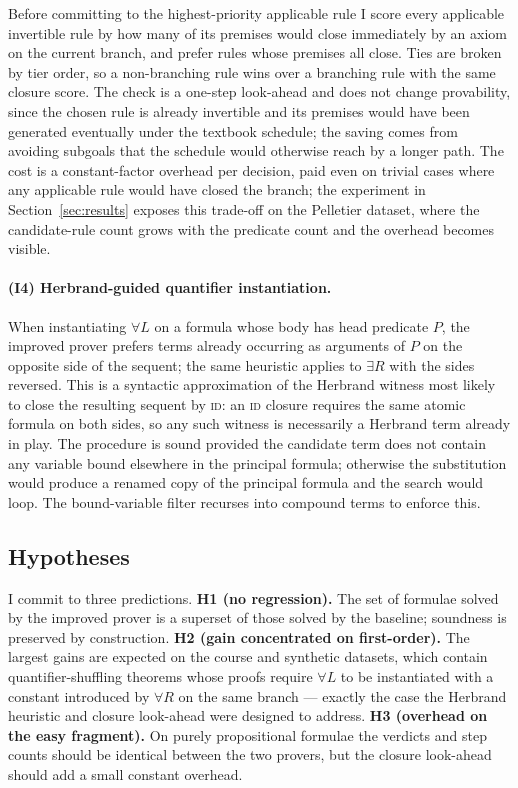 \documentclass[runningheads]{llncs}
\begin{document}
Before committing to the highest-priority applicable rule I score every
applicable invertible rule by how many of its premises would close
immediately by an axiom on the current branch, and prefer rules whose
premises all close. Ties are broken by tier order, so a non-branching
rule wins over a branching rule with the same closure score. The check
is a one-step look-ahead and does not change provability, since the
chosen rule is already invertible and its premises would have been
generated eventually under the textbook schedule; the saving comes from
avoiding subgoals that the schedule would otherwise reach by a longer
path. The cost is a constant-factor overhead per decision, paid even on
trivial cases where any applicable rule would have closed the branch;
the experiment in Section~\ref{sec:results} exposes this trade-off on
the Pelletier dataset, where the candidate-rule count grows with the
predicate count and the overhead becomes visible.

\paragraph{(I4) Herbrand-guided quantifier instantiation.}

When instantiating $\forall L$ on a formula whose body has head
predicate $P$, the improved prover prefers terms already occurring as
arguments of $P$ on the opposite side of the sequent; the same
heuristic applies to $\exists R$ with the sides reversed. This is a
syntactic approximation of the Herbrand witness most likely to close
the resulting sequent by \textsc{id}: an \textsc{id} closure requires
the same atomic formula on both sides, so any such witness is
necessarily a Herbrand term already in play. The procedure is sound
provided the candidate term does not contain any variable bound
elsewhere in the principal formula; otherwise the substitution would
produce a renamed copy of the principal formula and the search would
loop. The bound-variable filter recurses into compound terms to
enforce this.

\subsection{Hypotheses}
\label{sec:hypotheses}


I commit to three predictions.
\textbf{H1 (no regression).} The set of formulae solved by the improved
prover is a superset of those solved by the baseline; soundness is
preserved by construction.
\textbf{H2 (gain concentrated on first-order).} The largest gains are
expected on the course and synthetic datasets, which contain
quantifier-shuffling theorems whose proofs require $\forall L$ to be
instantiated with a constant introduced by $\forall R$ on the same
branch --- exactly the case the Herbrand heuristic and closure
look-ahead were designed to address.
\textbf{H3 (overhead on the easy fragment).} On purely propositional
formulae the verdicts and step counts should be identical between the
two provers, but the closure look-ahead should add a small constant
overhead.
\end{document}
